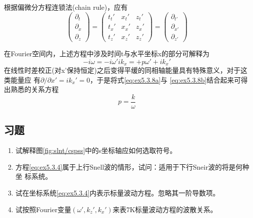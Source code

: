 根据偏微分方程连锁法(chain rule)，应有
\begin{equation}
\begin{pmatrix}
\partial_t \\
\partial_x \\
\partial_z 
\end{pmatrix}
=\begin{pmatrix}
t_t' & x_t' & z_t'\\
t_x' & x_x' & z_x'\\
t_z' & x_z' & z_z'
\end{pmatrix}
=
\begin{pmatrix}
\partial_{t'} \\
\partial_{x'} \\
\partial_{z'} 
\end{pmatrix}
\label{eq:ex5.3.7}
\end{equation}

在Fourier空间内，上述方程中涉及时间t与水平坐标x的部分可解释为
\begin{subequations}
\begin{equation}
-i\omega=-i\omega'
\label{eq:ex5.3.8a}
\end{equation}
\begin{equation}
ik_x=+p\omega'+ik_x'
\label{eq:ex5.3.8b}
\end{equation}
\label{eq:ex5.3.8}
\end{subequations}
在线性时差校正(对x'保持恒定)之后变得平缓的同相轴能量具有特殊意义，对于这类能量应
有$\partial/\partial x'=ik_x'=0$，于是将式\ref{eq:ex5.3.8a}与
\ref{eq:ex5.3.8b}结合起来可得出熟悉的关系方程
\begin{equation}
p=\frac{k}{\omega}
\label{eq:ex5.3.9}
\end{equation}

\subsection{习题}
\label{sec:5.3.8}
\begin{enumerate}
\item 试解释图\ref{fig:slnt/cspss}中的s坐标轴应如何选取符号。
\item 方程\ref{eq:ex5.3.4}属于上行Snell波的情形，试问：适用于下行Sneir波的将是何种坐
标系统。
\item 试在坐标系统\ref{eq:ex5.3.4}内表示标量波动方程。忽略其一阶导数项。
\item 试按照Fourier变量$(\omega ',k_z',k_x')$来表7K标量波动方程的波散关系。
\end{enumerate}












